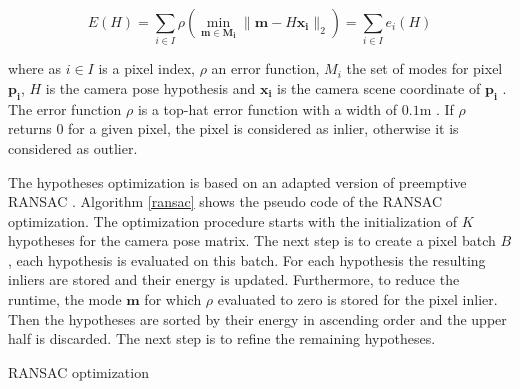\documentclass[final]{cvpr}
\begin{document}
\begin{equation}
	E(H) = \sum_{i \in I} \rho(\min_{\boldsymbol{m} \in \boldsymbol{M_{i}}} 
	\| \boldsymbol{m} - H \boldsymbol{x_{i}} \|_{2}) = \sum_{i \in I}e_{i}(H)
\end{equation}

where as $i \in I$ is a pixel index,  $\rho$ an error function, $M_{i}$ 
the set of modes for pixel $\boldsymbol{p_{i}}$, $H$ is the camera pose hypothesis and $\boldsymbol{x_{i}}$ is the camera
scene coordinate of $\boldsymbol{p_{i}}$ \cite{shotton2013}. The error function $\rho$ is a top-hat error 
function with a width of $0.1$m \cite{shotton2013}. If $\rho$ returns $0$ for a given pixel, the pixel is considered as inlier, otherwise it is considered as outlier.

The hypotheses optimization is based on an adapted version of preemptive RANSAC \cite{shotton2013}. Algorithm \autoref{ransac} shows the pseudo code of the RANSAC optimization.
The optimization procedure starts with the initialization of $K$ hypotheses for the camera pose matrix. The next step is to create a pixel batch $B$,
each hypothesis is evaluated on this batch. For each hypothesis the resulting inliers are stored and their energy is updated. Furthermore, to reduce the runtime, the mode $\boldsymbol{m}$ for which $\rho$ evaluated to zero is stored for
the pixel inlier.
Then the hypotheses are sorted by their energy in ascending order and the upper half is discarded. The next step is to refine the remaining hypotheses.

\begin{algorithm}
	\caption{RANSAC optimization}\label{ransac}
\end{algorithm}
\end{document}
